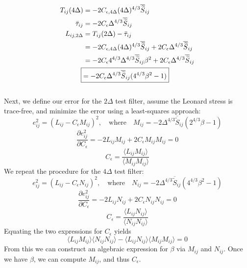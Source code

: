 \documentclass[11pt]{article}
\begin{document}
\begin{enumerate}
{\begin{align*}
T_{ij} (4\Delta) &= -2C_{\epsilon, 4\Delta} (4\Delta)^{4/3} \overline{\widetilde{S}}_{ij}\\
\bar \tau_{ij} &= -2C_{\epsilon} \Delta^{4/3} \overline{\widetilde{S}}_{ij}\\
L_{ij, 2\Delta} &= T_{ij} (2\Delta) - \bar \tau_{ij}\\
&= -2C_{\epsilon, 4\Delta} (4\Delta)^{4/3} \overline{\widetilde{S}}_{ij} + 2C_{\epsilon} \Delta^{4/3} \overline{\widetilde{S}}_{ij}\\
&= -2C_{\epsilon} 4^{4/3} \Delta^{4/3} \overline{\widetilde{S}}_{ij} \beta^2 + 2C_{\epsilon} \Delta^{4/3} \overline{\widetilde{S}}_{ij}\\
\Aboxed{&=-2C_{\epsilon} \Delta^{4/3} \overline{\widetilde{S}}_{ij} (4^{4/3}\beta^2 -1)}
\end{align*}
~\\
Next, we define our error for the $2\Delta$ test filter, assume the Leonard stress is trace-free, and minimize the error using a least-squares approach:
$$e_{ij}^2 = (L_{ij} - C_{\epsilon}M_{ij})^2, \quad \text{where} \quad M_{ij} = -2\Delta^{4/3}\overline{\widetilde{S}}_{ij} (2^{4/3}\beta -1)$$
$$\frac{\partial e^2_{ij}}{\partial C_{\epsilon}} = -2L_{ij}M_{ij} + 2C_{\epsilon}M_{ij}M_{ij} = 0$$
$$C_{\epsilon} =\frac{\langle L_{ij} M_{ij} \rangle}{\langle M_{ij} M_{ij} \rangle}$$ 
We repeat the procedure for the $4\Delta$ test filter:
$$e_{ij}^2 = (L_{ij} - C_{\epsilon}N_{ij})^2, \quad \text{where} \quad N_{ij} = -2\Delta^{4/3}\overline{\widetilde{S}}_{ij} (4^{4/3}\beta^2 -1)$$
$$\frac{\partial e^2_{ij}}{\partial C_{\epsilon}} = -2L_{ij}N_{ij} + 2C_{\epsilon}N_{ij}N_{ij} = 0$$
$$C_{\epsilon} =\frac{\langle L_{ij} N_{ij} \rangle}{\langle N_{ij} N_{ij} \rangle}$$ 
Equating the two expressions for $C_\epsilon$ yields
$$\langle L_{ij} M_{ij} \rangle \langle N_{ij} N_{ij} \rangle - \langle L_{ij} N_{ij} \rangle \langle M_{ij} M_{ij} \rangle = 0$$
From this we can construct an algebraic expression for $\beta$ via $M_{ij}$ and $N_{ij}$. Once we have $\beta$, we can compute $M_{ij}$, and thus $C_\epsilon$.
}

\end{enumerate}
\end{document}
